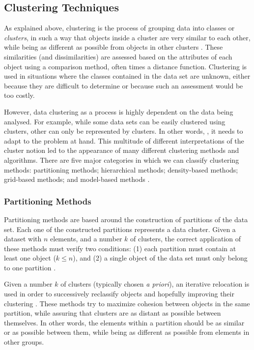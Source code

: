 \subsection{Clustering Techniques}\label{sec:clustertech}

As explained above, clustering is the process of grouping data into classes or
\emph{clusters}, in such a way that objects inside a cluster are very similar to
each other, while being as different as possible from objects in other clusters
\cite{han2006data}. These similarities (and dissimilarities) are assessed based
on the attributes of each object using a comparison method, often times a
distance function. Clustering is used in situations where the classes contained
in the data set are unknown, either because they are difficult to determine or
because such an assessment would be too costly.

However, data clustering as a process is highly dependent on the data being
analysed. For example, while some data sets can be easily clustered using
 clusters, other can only be represented by  clusters.
In other words,  \cite{Estivill-Castro:2002:WSM:568574.568575}, it needs to adapt to
the problem at hand. This multitude of different interpretations of the cluster
notion led to the appearance of many different clustering methods and
algorithms. There are five major categories in which we can classify clustering
methods: partitioning methods; hierarchical methods; density-based methods;
grid-based methods; and model-based methods \cite{han2006data}.

\subsubsection*{Partitioning Methods}

Partitioning methods are based around the construction of partitions of the data
set. Each one of the constructed partitions represents a data cluster. Given a
dataset with $n$ elements, and a number $k$ of clusters, the correct application
of these methods must verify two conditions: (1) each partition must contain at
least one object ($k \leq n$), and (2) a single object of the data set must only
belong to one partition \cite{han2006data}.

Given a number $k$ of clusters (typically chosen \emph{a priori}), an iterative
relocation is used in order to successively reclassify objects and hopefully
improving their clustering \cite{DBLP:journals/corr/abs-1205-1117}. These
methods try to maximize cohesion between objects in the same partition, while
assuring that clusters are as distant as possible between themselves. In other
words, the elements within a partition should be as similar or  as
possible between them, while being as different as possible from elements in
other groups.

